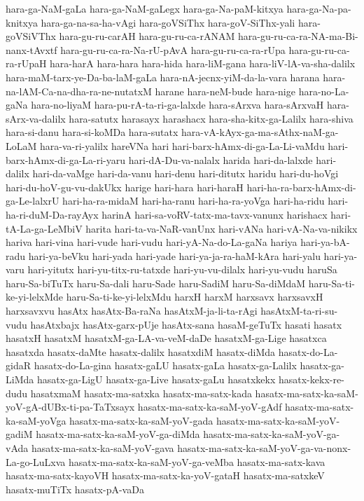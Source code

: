 {hara-ga-NaM-gaLa
hara-ga-NaM-gaLegx
hara-ga-Na-paM-kitxya
hara-ga-Na-pa-knitxya
hara-ga-na-sa-ha-vAgi
hara-goVSiThx
hara-goV-SiThx-yali
hara-goVSiVThx
hara-gu-ru-carAH
hara-gu-ru-ca-rANAM
hara-gu-ru-ca-ra-NA-ma-Bi-nanx-tAvxtf
hara-gu-ru-ca-ra-Na-rU-pAvA
hara-gu-ru-ca-ra-rUpa
hara-gu-ru-ca-ra-rUpaH
hara-harA
hara-hara
hara-hida
hara-liM-gana
hara-liV-lA-va-sha-dalilx
hara-maM-tarx-ye-Da-ba-laM-gaLa
hara-nA-jecnx-yiM-da-la-vara
harana
hara-na-lAM-Ca-na-dha-ra-ne-nutatxM
harane
hara-neM-bude
hara-nige
hara-no-La-gaNa
hara-no-liyaM
hara-pu-rA-ta-ri-ga-lalxde
hara-sArxva
hara-sArxvaH
hara-sArx-va-dalilx
hara-satutx
harasayx
harashacx
hara-sha-kitx-ga-Lalilx
hara-shiva
hara-si-danu
hara-si-koMDa
hara-sutatx
hara-vA-kAyx-ga-ma-sAthx-naM-ga-LoLaM
hara-va-ri-yalilx
hareVNa
hari
hari-barx-hAmx-di-ga-La-Li-vaMdu
hari-barx-hAmx-di-ga-La-ri-yaru
hari-dA-Du-va-nalalx
harida
hari-da-lalxde
hari-dalilx
hari-da-vaMge
hari-da-vanu
hari-denu
hari-ditutx
haridu
hari-du-hoVgi
hari-du-hoV-gu-vu-dakUkx
harige
hari-hara
hari-haraH
hari-ha-ra-barx-hAmx-di-ga-Le-lalxrU
hari-ha-ra-midaM
hari-ha-ranu
hari-ha-ra-yoVga
hari-ha-ridu
hari-ha-ri-duM-Da-rayAyx
harinA
hari-sa-voRV-tatx-ma-tavx-vanunx
harishacx
hari-tA-La-ga-LeMbiV
harita
hari-ta-va-NaR-vanUnx
hari-vANa
hari-vA-Na-va-nikikx
hariva
hari-vina
hari-vude
hari-vudu
hari-yA-Na-do-La-gaNa
hariya
hari-ya-bA-radu
hari-ya-beVku
hari-yada
hari-yade
hari-ya-ja-ra-haM-kAra
hari-yalu
hari-ya-varu
hari-yitutx
hari-yu-titx-ru-tatxde
hari-yu-vu-dilalx
hari-yu-vudu
haruSa
haru-Sa-biTuTx
haru-Sa-dali
haru-Sade
haru-SadiM
haru-Sa-diMdaM
haru-Sa-ti-ke-yi-lelxMde
haru-Sa-ti-ke-yi-lelxMdu
harxH
harxM
harxsavx
harxsavxH
harxsavxvu
hasAtx
hasAtx-Ba-raNa
hasAtxM-ja-li-ta-rAgi
hasAtxM-ta-ri-su-vudu
hasAtxbajx
hasAtx-garx-pUje
hasAtx-sana
hasaM-geTuTx
hasati
hasatx
hasatxH
hasatxM
hasatxM-ga-LA-va-veM-daDe
hasatxM-ga-Lige
hasatxca
hasatxda
hasatx-daMte
hasatx-dalilx
hasatxdiM
hasatx-diMda
hasatx-do-La-gidaR
hasatx-do-La-gina
hasatx-gaLU
hasatx-gaLa
hasatx-ga-Lalilx
hasatx-ga-LiMda
hasatx-ga-LigU
hasatx-ga-Live
hasatx-gaLu
hasatxkekx
hasatx-kekx-re-dudu
hasatxmaM
hasatx-ma-satxka
hasatx-ma-satx-kada
hasatx-ma-satx-ka-saM-yoV-gA-dUBx-ti-pa-TaTxsayx
hasatx-ma-satx-ka-saM-yoV-gAdf
hasatx-ma-satx-ka-saM-yoVga
hasatx-ma-satx-ka-saM-yoV-gada
hasatx-ma-satx-ka-saM-yoV-gadiM
hasatx-ma-satx-ka-saM-yoV-ga-diMda
hasatx-ma-satx-ka-saM-yoV-ga-vAda
hasatx-ma-satx-ka-saM-yoV-gava
hasatx-ma-satx-ka-saM-yoV-ga-va-nonx-La-go-LuLxva
hasatx-ma-satx-ka-saM-yoV-ga-veMba
hasatx-ma-satx-kava
hasatx-ma-satx-kayoVH
hasatx-ma-satx-ka-yoV-gataH
hasatx-ma-satxkeV
hasatx-muTiTx
hasatx-pA-vaDa
}
